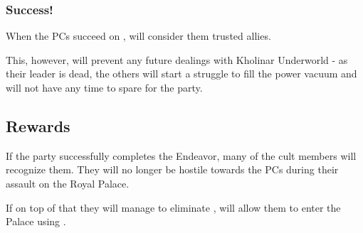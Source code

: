 \subsubsection{Success!}

When the PCs succeed on \npcGhostbloodBoss{}, \npcRevelerGuide{} will consider them trusted allies.

This, however, will prevent any future dealings with Kholinar Underworld - as their leader is dead, the others will start a struggle to fill the power vacuum and will not have any time to spare for the party.


\subsection{Rewards}

If the party successfully completes the Endeavor, many of the cult members will recognize them. They will no longer be hostile towards the PCs during their assault on the Royal Palace.

If on top of that they will manage to eliminate \npcGhostbloodBoss{}, \npcRevelerGuide{} will allow them to enter the Palace using .